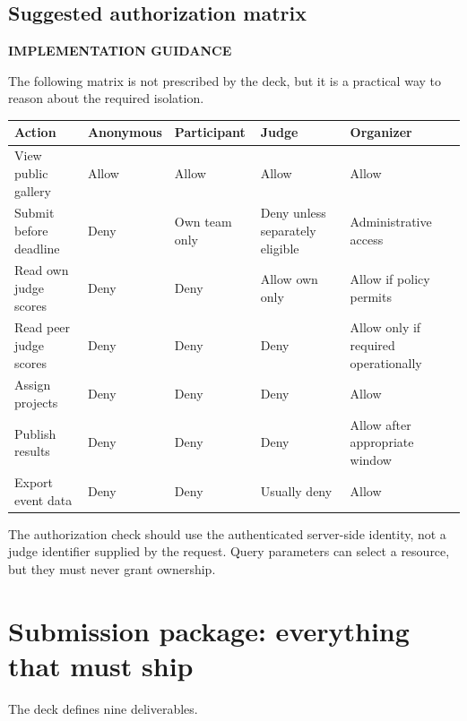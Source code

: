 \documentclass[11pt]{article}
\newcommand{\advisory}{\textcolor{DeepBlue}{\textbf{IMPLEMENTATION GUIDANCE}}}
\begin{document}
\subsection{Suggested authorization matrix}

\advisory\par


The following matrix is not prescribed by the deck, but it is a practical way to reason about the required isolation.

\begin{tabularx}{\linewidth}{@{}L{29mm}Y Y Y Y@{}}
\toprule
\textbf{Action} & \textbf{Anonymous} & \textbf{Participant} & \textbf{Judge} & \textbf{Organizer}\\
\midrule
View public gallery & Allow & Allow & Allow & Allow\\
Submit before deadline & Deny & Own team only & Deny unless separately eligible & Administrative access\\
Read own judge scores & Deny & Deny & Allow own only & Allow if policy permits\\
Read peer judge scores & Deny & Deny & Deny & Allow only if required operationally\\
Assign projects & Deny & Deny & Deny & Allow\\
Publish results & Deny & Deny & Deny & Allow after appropriate window\\
Export event data & Deny & Deny & Usually deny & Allow\\
\bottomrule
\end{tabularx}

The authorization check should use the authenticated server-side identity, not a judge identifier supplied by the request. Query parameters can select a resource, but they must never grant ownership.

\section{Submission package: everything that must ship}

The deck defines nine deliverables.
\end{document}
